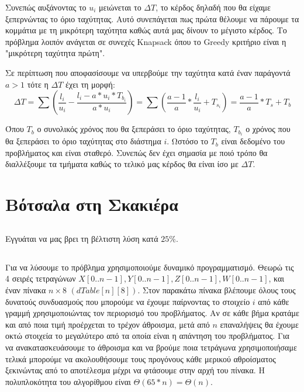 \documentclass[a4paper,10pt]{article} \usepackage{anysize}
\begin{document}
Συνεπώς αυξάνοντας το $u_i$ μειώνεται το $\Delta{T}$, το κέρδος δηλαδή που θα
είχαμε ξεπερνώντας το όριο ταχύτητας. Αυτό συνεπάγεται πως πρώτα θέλουμε να
πάρουμε τα κομμάτια με τη μικρότερη ταχύτητα καθώς αυτά μας δίνουν το μέγιστο
κέρδος. Το πρόβλημα λοιπόν ανάγεται σε συνεχές Knapsack όπου το Greedy
κριτήριο είναι η "μικρότερη ταχύτητα πρώτη".

Σε περίπτωση που αποφασίσουμε να υπερβούμε την ταχύτητα κατά έναν παράγοντά
$a>1$ τότε η $\Delta{T}$ έχει τη μορφή:
\[
	\Delta{T}=\sum{(\frac{l_i}{u_i} - \frac{l_i-a*u_i*T_{b_i}}{a*u_i})} =
	\sum{(\frac{a-1}{a}*\frac{l_i}{u_i}+T_{s_i})} = \frac{a-1}{a}*T_s+T_b
\] 

Όπου $T_b$ ο συνολικός χρόνος που θα ξεπεράσει το όριο ταχύτητας, $T_{b_i}$ ο
χρόνος που θα ξεπεράσει το όριο ταχύτητας στο διάστημα $i$.  
Ωστόσο το $T_b$ είναι δεδομένο του προβλήματος και είναι σταθερό. Συνεπώς δεν
έχει σημασία με ποιό τρόπο θα διαλλέξουμε τα τμήματα καθώς το τελικό μας
κέρδος θα είναι ίσο με $\Delta{T}$.

\section{Βότσαλα στη Σκακιέρα}
\subsection{} Εγγυάται να μας βρει τη βέλτιστη λύση κατά $25\%$.
\subsection{} Για να λύσουμε το πρόβλημα χρησιμοποιούμε δυναμικό προγραμματισμό. Θεωρώ τις 4 σειρές
τετραγώνων $X[0..n-1],Y[0..n-1],Z[0..n-1],W[0..n-1]$, και έναν πίνακα
$n\times8$ $(dTable[n][8])$. Στον παρακάτω πίνακα βλέπουμε
όλους τους δυνατούς συνδυασμούς που μπορούμε να έχουμε παίρνοντας το στοιχείο
$i$ από κάθε γραμμή χρησιμοποιώντας τον περιορισμό του προβλήματος. Αν σε κάθε
βήμα κρατάμε και από ποια τιμή προέρχεται το τρέχον άθροισμα, μετά από $n$
επαναλήψεις θα έχουμε οκτώ στοιχεία το μεγαλύτερο από τα οποία είναι η
απάντηση του προβλήματος. Για να ανακατασκευάσουμε το άθροισμα και να βρούμε
ποια τετράγωνα χρησιμοποιήσαμε τελικά μπορούμε να ακολουθήσουμε τους προγόνους
κάθε μερικού αθροίσματος ξεκινώντας από το αποτέλεσμα μέχρι να φτάσουμε στην
αρχή του πίνακα. Η πολυπλοκότητα του αλγορίθμου είναι
$\Theta{(65*n)}=\Theta{(n)}$.
\end{document}
